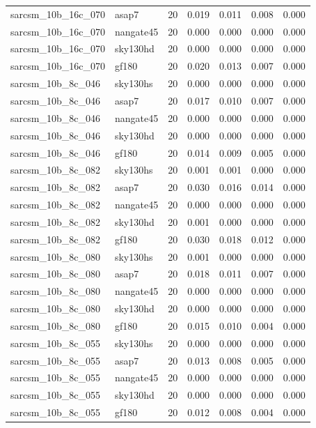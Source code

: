 \begin{tabular}{llrrrrr}
sarcsm\_10b\_16c\_070 & asap7 & 20 & 0.019 & 0.011 & 0.008 & 0.000 \\
sarcsm\_10b\_16c\_070 & nangate45 & 20 & 0.000 & 0.000 & 0.000 & 0.000 \\
sarcsm\_10b\_16c\_070 & sky130hd & 20 & 0.000 & 0.000 & 0.000 & 0.000 \\
sarcsm\_10b\_16c\_070 & gf180 & 20 & 0.020 & 0.013 & 0.007 & 0.000 \\
sarcsm\_10b\_8c\_046 & sky130hs & 20 & 0.000 & 0.000 & 0.000 & 0.000 \\
sarcsm\_10b\_8c\_046 & asap7 & 20 & 0.017 & 0.010 & 0.007 & 0.000 \\
sarcsm\_10b\_8c\_046 & nangate45 & 20 & 0.000 & 0.000 & 0.000 & 0.000 \\
sarcsm\_10b\_8c\_046 & sky130hd & 20 & 0.000 & 0.000 & 0.000 & 0.000 \\
sarcsm\_10b\_8c\_046 & gf180 & 20 & 0.014 & 0.009 & 0.005 & 0.000 \\
sarcsm\_10b\_8c\_082 & sky130hs & 20 & 0.001 & 0.001 & 0.000 & 0.000 \\
sarcsm\_10b\_8c\_082 & asap7 & 20 & 0.030 & 0.016 & 0.014 & 0.000 \\
sarcsm\_10b\_8c\_082 & nangate45 & 20 & 0.000 & 0.000 & 0.000 & 0.000 \\
sarcsm\_10b\_8c\_082 & sky130hd & 20 & 0.001 & 0.000 & 0.000 & 0.000 \\
sarcsm\_10b\_8c\_082 & gf180 & 20 & 0.030 & 0.018 & 0.012 & 0.000 \\
sarcsm\_10b\_8c\_080 & sky130hs & 20 & 0.001 & 0.000 & 0.000 & 0.000 \\
sarcsm\_10b\_8c\_080 & asap7 & 20 & 0.018 & 0.011 & 0.007 & 0.000 \\
sarcsm\_10b\_8c\_080 & nangate45 & 20 & 0.000 & 0.000 & 0.000 & 0.000 \\
sarcsm\_10b\_8c\_080 & sky130hd & 20 & 0.000 & 0.000 & 0.000 & 0.000 \\
sarcsm\_10b\_8c\_080 & gf180 & 20 & 0.015 & 0.010 & 0.004 & 0.000 \\
sarcsm\_10b\_8c\_055 & sky130hs & 20 & 0.000 & 0.000 & 0.000 & 0.000 \\
sarcsm\_10b\_8c\_055 & asap7 & 20 & 0.013 & 0.008 & 0.005 & 0.000 \\
sarcsm\_10b\_8c\_055 & nangate45 & 20 & 0.000 & 0.000 & 0.000 & 0.000 \\
sarcsm\_10b\_8c\_055 & sky130hd & 20 & 0.000 & 0.000 & 0.000 & 0.000 \\
sarcsm\_10b\_8c\_055 & gf180 & 20 & 0.012 & 0.008 & 0.004 & 0.000 \\

\end{tabular}
